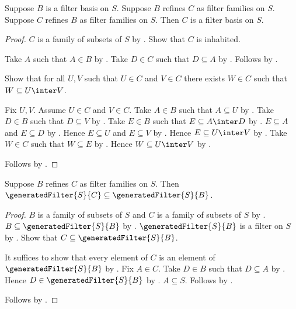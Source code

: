 \begin{proposition}\label{mutual_refinement_preserves_filter_basis}
    Suppose $B$ is a filter basis on $S$.
    Suppose $B$ refines $C$ as filter families on $S$.
    Suppose $C$ refines $B$ as filter families on $S$.
    Then $C$ is a filter basis on $S$.
\end{proposition}
\begin{proof}
    $C$ is a family of subsets of $S$ by
        .
    Show that $C$ is inhabited.
    \begin{subproof}
        Take $A$ such that $A\in B$ by .
        Take $D\in C$ such that $D\subseteq A$ by
            .
        Follows by \auto.
    \end{subproof}

    Show that for all $U,V$ such that $U\in C$ and $V\in C$
        there exists $W\in C$ such that $W\subseteq U\inter V$.
    \begin{subproof}
        Fix $U,V$.
        Assume $U\in C$ and $V\in C$.
        Take $A\in B$ such that $A\subseteq U$ by
            .
        Take $D\in B$ such that $D\subseteq V$ by
            .
        Take $E\in B$ such that $E\subseteq A\inter D$ by
            .
        $E\subseteq A$ and $E\subseteq D$ by
            .
        Hence $E\subseteq U$ and $E\subseteq V$ by
            .
        Hence $E\subseteq U\inter V$ by .
        Take $W\in C$ such that $W\subseteq E$ by
            .
        Hence $W\subseteq U\inter V$ by .
    \end{subproof}
    Follows by .
\end{proof}

\begin{theorem}\label{filter_family_refinement_generated_filter_inclusion}
    Suppose $B$ refines $C$ as filter families on $S$.
    Then $\generatedFilter{S}{C}\subseteq\generatedFilter{S}{B}$.
\end{theorem}
\begin{proof}
    $B$ is a family of subsets of $S$ and
        $C$ is a family of subsets of $S$ by
        .
    $B\subseteq\generatedFilter{S}{B}$ by
        .
    $\generatedFilter{S}{B}$ is a filter on $S$ by
        .
    Show that $C\subseteq\generatedFilter{S}{B}$.
    \begin{subproof}
        It suffices to show that every element of $C$ is an element of
            $\generatedFilter{S}{B}$ by .
        Fix $A\in C$.
        Take $D\in B$ such that $D\subseteq A$ by
            .
        Hence $D\in\generatedFilter{S}{B}$ by .
        $A\subseteq S$.
        Follows by .
    \end{subproof}
    Follows by .
\end{proof}

